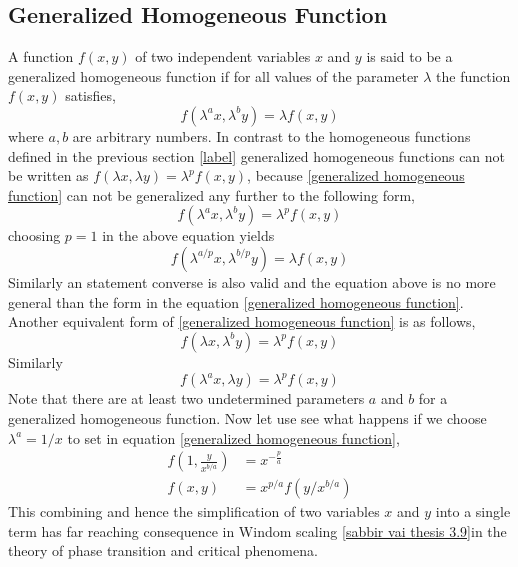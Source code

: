 	
	
	\subsection{Generalized Homogeneous Function}
	A function $f(x,y)$ of two independent variables $x$ and $y$ is said to be a generalized homogeneous function if for all values of the parameter $\lambda$ the function $f(x,y)$ satisfies,
	\begin{equation}
		f(\lambda^a x, \lambda^b y) = \lambda f(x,y)
		\label{generalized homogeneous function}
	\end{equation}
	where $a,b$ are arbitrary numbers. In contrast to the homogeneous functions defined in the previous section \ref{label} generalized homogeneous functions can not be written as $f(\lambda x, \lambda y) = \lambda^p f(x,y)$, because \ref{generalized homogeneous function} can not be generalized any further to the following form,
	\begin{equation}
		f(\lambda^a x, \lambda^b y) = \lambda^p f(x,y)
	\end{equation}
	choosing $p=1$ in the above equation yields
	\begin{equation}
		f(\lambda^{a/p} x, \lambda^{b/p} y) = \lambda f(x,y)
	\end{equation}
	Similarly an statement converse is also valid and the equation above is no more general than the form in the equation \ref{generalized homogeneous function}. Another equivalent form of \ref{generalized homogeneous function}  is as follows,
	\begin{equation}
		f(\lambda x, \lambda^b y) = \lambda^p f(x,y)
	\end{equation}
	Similarly
	\begin{equation}
		f(\lambda^a x, \lambda y) = \lambda^p f(x,y)
	\end{equation}
	Note that there are at least two undetermined parameters $a$ and $b$ for a generalized homogeneous function. Now let use see what happens if we choose $\lambda^a = 1/x$ to set in equation \ref{generalized homogeneous function},
	\begin{align}
		f(1, \frac{y}{x^{b/a}}) &= x^{-\frac{p}{a}} \\
		f(x,y) &= x^{p/a} f(y/x^{b/a})
	\end{align}
	This combining and hence the simplification of two variables $x$ and $y$ into a single term has far reaching consequence in Windom scaling \ref{sabbir vai thesis 3.9}in the theory of phase transition and critical phenomena.

